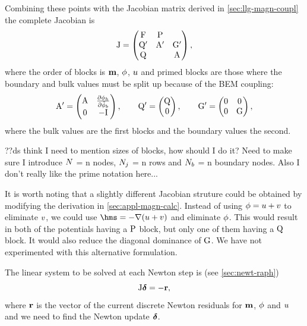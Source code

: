Combining these points with the Jacobian matrix derived in \cref{sec:llg-magn-coupl} the complete Jacobian is
\begin{equation}
  \mathrm{J} =
  \begin{pmatrix}
    \mathrm{F}       & \mathrm{P}     &  \\
    \mathrm{Q}'      & \mathrm{A}' &  {\mathbf{\mathrm{G}}}'  \\
    \mathrm{Q}       &         &   \mathrm{A}
  \end{pmatrix},
  \label{eq:16}
\end{equation}
where the order of blocks is $\boldsymbol{\mathrm{m}}$, $\phi$, $u$ and primed blocks are those where the boundary and bulk values must be split up because of the BEM coupling:
\begin{equation}
  \mathrm{A}' =
  \begin{pmatrix}
    \mathrm{A}     & \frac{\partial {\phi}_h}{\partial \tilde{\phi}_b} \\
    0      & -\mathrm{I}
  \end{pmatrix},
  \qquad
  \mathrm{Q}' =
  \begin{pmatrix}
    \mathrm{Q} \\
    0
  \end{pmatrix},
  \qquad
  {\mathbf{\mathrm{G}}}' =
  \begin{pmatrix}
    0  & 0 \\
    0  & {\mathbf{\mathrm{G}}}
  \end{pmatrix},
\end{equation}
where the bulk values are the first blocks and the boundary values the second.

??ds think I need to mention sizes of blocks, how should I do it?
Need to make sure I introduce $N$ = n nodes, $N_j$ = n rows and $N_b$ = n boundary nodes.
Also I don't really like the prime notation here...

It is worth noting that a slightly different Jacobian struture could be obtained by modifying the derivation in \cref{sec:appl-magn-calc}.
Instead of using $\phi = u + v$ to eliminate $v$, we could use $\hms = - \grad ( \phione + \phitwo)$ and eliminate $\phi$.
This would result in both of the potentials having a $\mathrm{P}$ block, but only one of them having a $\mathrm{Q}$ block.
It would also reduce the diagonal dominance of ${\mathbf{\mathrm{G}}}$.
We have not experimented with this alternative formulation.

The linear system to be solved at each Newton step is (see \cref{sec:newt-raph})
\begin{equation}
  \mathrm{J} \boldsymbol{\mathrm{\delta}} = -\boldsymbol{\mathrm{r}},
  \label{eq:87}
\end{equation}
where $\boldsymbol{\mathrm{r}}$ is the vector of the current discrete Newton residuals for $\boldsymbol{\mathrm{m}}$, $\phi$ and $u$ and we need to find the Newton update $\boldsymbol{\mathrm{\delta}}$.


